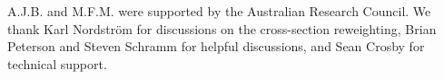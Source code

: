 A.J.B. and M.F.M. were supported by the Australian Research Council. We thank Karl Nordstr{\"o}m for discussions on the cross-section reweighting, Brian Peterson and Steven Schramm for helpful discussions, and Sean Crosby for technical support.